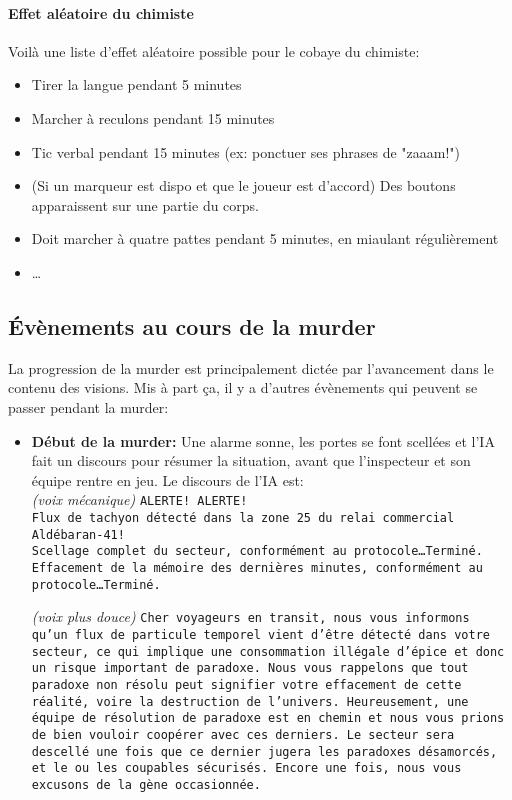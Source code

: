 {	
	\paragraph{Effet aléatoire du chimiste} Voilà une liste d'effet aléatoire possible pour le cobaye du chimiste:
	\begin{itemize}
		\item Tirer la langue pendant 5 minutes
		\item Marcher à reculons pendant 15 minutes
		\item Tic verbal pendant 15 minutes (ex: ponctuer ses phrases de "zaaam!")
		\item (Si un marqueur est dispo et que le joueur est d'accord) Des boutons apparaissent sur une partie du corps.
		\item Doit marcher à quatre pattes pendant 5 minutes, en miaulant régulièrement
		\item \dots
	\end{itemize}
	
	\subsection{Évènements au cours de la murder}
	
	\par La progression de la murder est principalement dictée par l'avancement dans le contenu des visions. Mis à part ça, il y a d'autres évènements qui peuvent se passer pendant la murder:
	\begin{itemize}
		\item \textbf{Début de la murder:} Une alarme sonne, les portes se font scellées et l'IA fait un discours pour résumer la situation, avant que l'inspecteur et son équipe rentre en jeu. Le discours de l'IA est:\\
		\emph{(voix mécanique)} \texttt{ALERTE! ALERTE!}\\
		\texttt{Flux de tachyon détecté dans la zone 25 du relai commercial Aldébaran-41!}\\
		\texttt{Scellage complet du secteur, conformément au protocole\dots Terminé.}\\
		\texttt{Effacement de la mémoire des dernières minutes, conformément au protocole\dots Terminé.}
		
		\emph{(voix plus douce)}
		\texttt{Cher voyageurs en transit, nous vous informons qu'un flux de particule temporel vient d'être détecté dans votre secteur, ce qui implique une consommation illégale d'épice et donc un risque important de paradoxe. Nous vous rappelons que tout paradoxe non résolu peut signifier votre effacement de cette réalité, voire la destruction de l'univers. Heureusement, une équipe de résolution de paradoxe est en chemin et nous vous prions de bien vouloir coopérer avec ces derniers. Le secteur sera descellé une fois que ce dernier jugera les paradoxes désamorcés, et le ou les coupables sécurisés. Encore une fois, nous vous excusons de la gène occasionnée.}
		

\end{itemize}}
